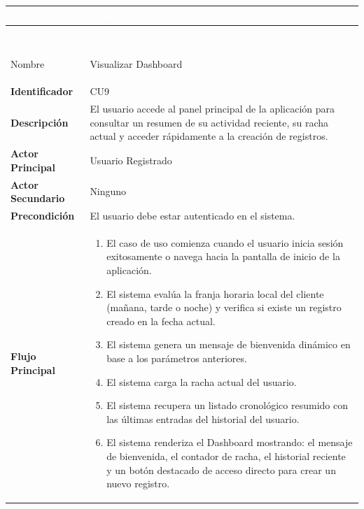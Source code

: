 \begingroup
\small 
\renewcommand{\arraystretch}{1.4}
\begin{xltabular}{\textwidth}{|>{\bfseries}p{3.5cm}|X|}
    \textcolor{white}{Campo} & \textcolor{white}{Descripción} \\ \hline
    \endfirsthead

     \\
    \hline
    \textcolor{white}{Campo} & \textcolor{white}{Descripción} \\ \hline
    \endhead

    Nombre & Visualizar Dashboard \\ \hline
    Identificador & CU9 \\ \hline
    Descripción & El usuario accede al panel principal de la aplicación para consultar un resumen de su actividad reciente, su racha actual y acceder rápidamente a la creación de registros. \\ \hline
    Actor Principal & Usuario Registrado \\ \hline
    Actor Secundario & Ninguno \\ \hline
    Precondición & El usuario debe estar autenticado en el sistema. \\ \hline
    Flujo Principal & 
    \begin{enumerate}[leftmargin=0.5cm, topsep=0pt, partopsep=0pt, parsep=0pt, itemsep=4pt]
        \item El caso de uso comienza cuando el usuario inicia sesión exitosamente o navega hacia la pantalla de inicio de la aplicación.
        \item El sistema evalúa la franja horaria local del cliente (mañana, tarde o noche) y verifica si existe un registro creado en la fecha actual.
        \item El sistema genera un mensaje de bienvenida dinámico en base a los parámetros anteriores.
        \item El sistema carga la racha actual del usuario.
        \item El sistema recupera un listado cronológico resumido con las últimas entradas del historial del usuario.
        \item El sistema renderiza el Dashboard mostrando: el mensaje de bienvenida, el contador de racha, el historial reciente y un botón destacado de acceso directo para crear un nuevo registro.
    \end{enumerate} 

\end{xltabular}
